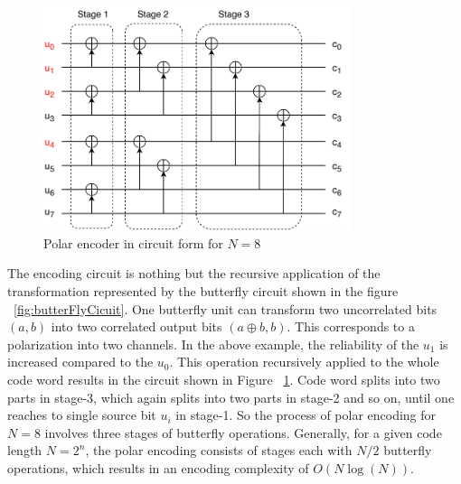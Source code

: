 \begin{figure}[h]
	\centering
	\includegraphics[width=0.8\textwidth]{./figures/EncodingCircuitStagesNew.pdf}
	\caption{Polar encoder in circuit form for $N = 8$}
	\label{fig:encoderCircuit}
\end{figure}

The encoding circuit is nothing but the recursive application of the transformation represented by the butterfly circuit shown in the figure ~\ref{fig:butterFlyCicuit}. One butterfly unit can transform two uncorrelated bits $(a,b)$ into two correlated output bits $(a\oplus b,b)$. This corresponds to a polarization into two channels. In the above example, the reliability of the $u_{1}$ is increased compared to the $u_{0}$. This operation recursively applied to the whole code word results in the circuit shown in Figure ~\ref{fig:encoderCircuit}. Code word splits into two parts in stage-3, which again splits into two parts in stage-2 and so on, until one reaches to single source bit $u_{i}$ in stage-1. So the process of polar encoding for $N = 8$ involves three stages of butterfly operations. Generally, for a given code length $N=2^{n}$, the polar encoding consists of stages each with $N/2$ butterfly operations, which results in an encoding complexity of $O(N\log(N))$.



